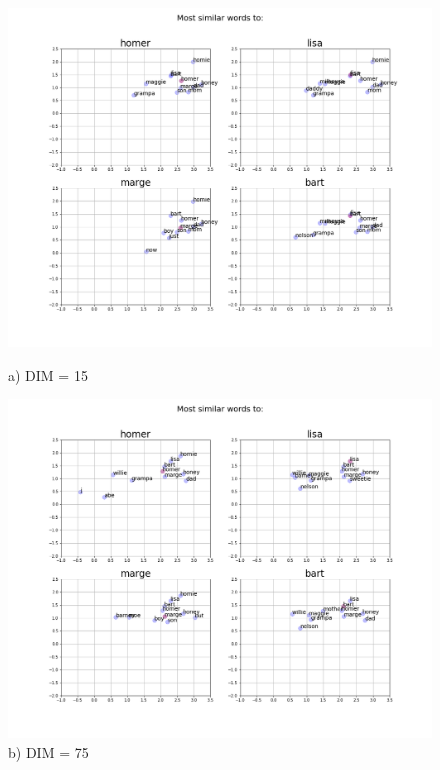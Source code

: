 \begin{figure}[H]

\centering
\begin{minipage}{0.47\textwidth}
\includegraphics[trim=4.2cm 3cm 3.7cm 2.7cm, clip=true, width=\textwidth]{results/embeddings/simpsons_similar_15.png}
\caption*{a) DIM = 15}
\end{minipage}\hfill
\begin{minipage}{0.47\textwidth}
\includegraphics[trim=4.2cm 3cm 3.7cm 2.7cm, clip=true, width=\textwidth]{results/embeddings/simpsons_similar_75.png}
\caption*{b) DIM = 75}
\end{minipage}\par

\end{figure}
